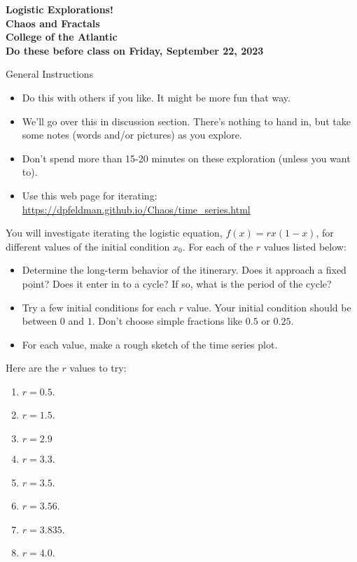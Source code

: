 \documentclass[12pt]{article}
\begin{document}
\pagestyle{empty}
 
\begin{center}
{\LARGE {\bf Logistic Explorations!}}\\
\bigskip
{\Large {\bf Chaos and Fractals}}\\
\bigskip
{\Large {\bf College of the Atlantic}}\\
\bigskip
    {{\bf Do these before class on Friday, September 22, 2023}}\\ 
\end{center}
\medskip

\noindent General Instructions

\begin{itemize}
\setlength{\itemsep}{0mm}
\item Do this with others if you like. It might be more fun that
  way.
\item We'll go over this in discussion section. There's nothing to
  hand in, but take some notes (words and/or pictures) as you
  explore.
\item Don't spend more than 15-20 minutes on these exploration (unless
  you want to).
  \item Use this web page for iterating:
\href{https://dpfeldman.github.io/Chaos/time_series.html}{https://dpfeldman.github.io/Chaos/time\_series.html}
\end{itemize}


\noindent You will investigate iterating the logistic equation, $f(x)
= rx(1-x)$, for different values of the initial condition $x_0$.  For
each of the $r$ values listed below:
\begin{itemize}
  \setlength{\itemsep}{0mm}
  \item Determine the long-term behavior of the itinerary. Does it
    approach a fixed point?  Does it enter in to a cycle?  If so, what
    is the period of the cycle?
  \item Try a few initial conditions for each $r$ value.  Your initial
    condition should be between $0$ and $1$.  Don't choose simple
    fractions like $0.5$ or $0.25$.
  \item For each value, make a rough sketch of the time series plot.\\
\end{itemize}


\noindent Here are the $r$ values to try:
\begin{enumerate}
\item $r=0.5$.
\item $r=1.5$.
\item $r=2.9$ 
\item $r=3.3$.
\item $r=3.5$.
\item $r=3.56$.
\item $r=3.835$.
\item $r=4.0$.
\end{enumerate}
\end{document}
